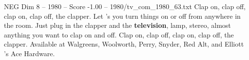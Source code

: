 \begin{textsample}{NEG Dim 8 – 1980 – Score -1.00 – 1980/tv\_com\_1980\_63.txt}  \label{ex:f8_neg_056}
Clap on, clap off, clap on, clap off, the clapper.
Let 's you turn things on or off from anywhere in the room.
Just plug in the clapper and the \textbf{television}, lamp, stereo, almost anything you want to clap on and off.
Clap on, clap off, clap on, clap off, the clapper.
Available at Walgreens, Woolworth, Perry, Snyder, Red Alt, and Elliott 's Ace Hardware.

\end{textsample}
